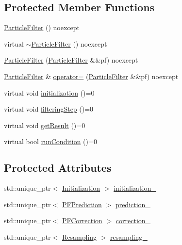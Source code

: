 \subsection*{Protected Member Functions}
\begin{DoxyCompactItemize}
\item 
\mbox{\hyperlink{classbfl_1_1ParticleFilter_a3f9b3d5551ea54744eccd7d7d956adfa}{Particle\+Filter}} () noexcept
\item 
virtual \mbox{\hyperlink{classbfl_1_1ParticleFilter_a11dcf55dd8fa9f246c2af2bf6decbaa3}{$\sim$\+Particle\+Filter}} () noexcept
\item 
\mbox{\hyperlink{classbfl_1_1ParticleFilter_a957e97f5ea94684b0b33f7f4511b29e5}{Particle\+Filter}} (\mbox{\hyperlink{classbfl_1_1ParticleFilter}{Particle\+Filter}} \&\&pf) noexcept
\item 
\mbox{\hyperlink{classbfl_1_1ParticleFilter}{Particle\+Filter}} \& \mbox{\hyperlink{classbfl_1_1ParticleFilter_af8a15189f6426c075236dd5e9c9a3107}{operator=}} (\mbox{\hyperlink{classbfl_1_1ParticleFilter}{Particle\+Filter}} \&\&pf) noexcept
\item 
virtual void \mbox{\hyperlink{classbfl_1_1FilteringAlgorithm_af2a072aa51407fe5544bdbb7ce466e2a}{initialization}} ()=0
\item 
virtual void \mbox{\hyperlink{classbfl_1_1FilteringAlgorithm_ab3bceb43b5810a4bf1da884b8a0b145a}{filtering\+Step}} ()=0
\item 
virtual void \mbox{\hyperlink{classbfl_1_1FilteringAlgorithm_acdfebf68405a427491e4dd9d020ae09b}{get\+Result}} ()=0
\item 
virtual bool \mbox{\hyperlink{classbfl_1_1FilteringAlgorithm_a5fc12882356f6906b102fbfff2bc4b7c}{run\+Condition}} ()=0
\end{DoxyCompactItemize}
\subsection*{Protected Attributes}
\begin{DoxyCompactItemize}
\item 
std\+::unique\+\_\+ptr$<$ \mbox{\hyperlink{classbfl_1_1Initialization}{Initialization}} $>$ \mbox{\hyperlink{classbfl_1_1ParticleFilter_a5aff690b4287811912a62548188a0dda}{initialization\+\_\+}}
\item 
std\+::unique\+\_\+ptr$<$ \mbox{\hyperlink{classbfl_1_1PFPrediction}{P\+F\+Prediction}} $>$ \mbox{\hyperlink{classbfl_1_1ParticleFilter_ab86f707d29a823423fe35de37e8f9d8e}{prediction\+\_\+}}
\item 
std\+::unique\+\_\+ptr$<$ \mbox{\hyperlink{classbfl_1_1PFCorrection}{P\+F\+Correction}} $>$ \mbox{\hyperlink{classbfl_1_1ParticleFilter_a691428357c812ba009e995175778c173}{correction\+\_\+}}
\item 
std\+::unique\+\_\+ptr$<$ \mbox{\hyperlink{classbfl_1_1Resampling}{Resampling}} $>$ \mbox{\hyperlink{classbfl_1_1ParticleFilter_a9b0b855942fa4fb847443b10fe26c589}{resampling\+\_\+}}
\end{DoxyCompactItemize}


